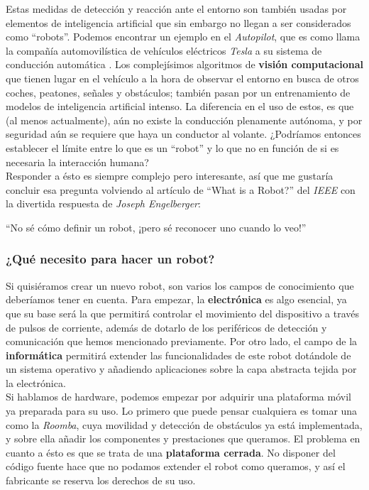 Estas medidas de detección y reacción ante el entorno son también usadas por elementos de inteligencia artificial que sin embargo no llegan a ser considerados como ``robots''. Podemos encontrar un ejemplo en el \textit{Autopilot}, que es como llama la compañía automovilística de vehículos eléctricos \textit{Tesla} a su sistema de conducción automática \cite{tesla-ai}. Los complejísimos algoritmos de \textbf{visión computacional} que tienen lugar en el vehículo a la hora de observar el entorno en busca de otros coches, peatones, señales y obstáculos; también pasan por un entrenamiento de modelos de inteligencia artificial intenso. La diferencia en el uso de estos, es que (al menos actualmente), aún no existe la conducción plenamente autónoma, y por seguridad aún se requiere que haya un conductor al volante. ¿Podríamos entonces establecer el límite entre lo que es un ``robot'' y lo que no en función de si es necesaria la interacción humana?\\

Responder a ésto es siempre complejo pero interesante, así que me gustaría concluir esa pregunta volviendo al artículo de ``What is a Robot?'' del \textit{IEEE} \cite{whats_a_robot} con la divertida respuesta de \textit{Joseph Engelberger}:

\begin{displayquote}
	``No sé cómo definir un robot, ¡pero sé reconocer uno cuando lo veo!''
\end{displayquote}

\subsubsection{¿Qué necesito para hacer un robot?}

Si quisiéramos crear un nuevo robot, son varios los campos de conocimiento que deberíamos tener en cuenta. Para empezar, la \textbf{electrónica} es algo esencial, ya que su base será la que permitirá controlar el movimiento del dispositivo a través de pulsos de corriente, además de dotarlo de los periféricos de detección y comunicación que hemos mencionado previamente. Por otro lado, el campo de la \textbf{informática} permitirá extender las funcionalidades de este robot dotándole de un sistema operativo y añadiendo aplicaciones sobre la capa abstracta tejida por la electrónica.\\

Si hablamos de hardware, podemos empezar por adquirir una plataforma móvil ya preparada para su uso. Lo primero que puede pensar cualquiera es tomar una como la \textit{Roomba}, cuya movilidad y detección de obstáculos ya está implementada, y sobre ella añadir los componentes y prestaciones que queramos. El problema en cuanto a ésto es que se trata de una \textbf{plataforma cerrada}. No disponer del código fuente hace que no podamos extender el robot como queramos, y así el fabricante se reserva los derechos de su uso.\\

